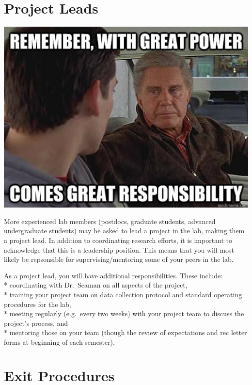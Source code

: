 \documentclass[
]{book}
\begin{document}
\hypertarget{project-leads}{%
\section{Project Leads}\label{project-leads}}

\includegraphics{images/power.jpg}

More experienced lab members (postdocs, graduate students, advanced undergraduate students) may be asked to lead a project in the lab, making them a project lead. In addition to coordinating research efforts, it is important to acknowledge that this is a leadership position. This means that you will most likely be repsonsible for supervising/mentoring some of your peers in the lab.

As a project lead, you will have additional responsibilities. These include:\\
* coordinating with Dr.~Seaman on all aspects of the project,\\
* training your project team on data collection protocol and standard operating procedures for the lab,\\
* meeting regularly (e.g.~every two weeks) with your project team to discuss the project's process, and\\
* mentoring those on your team (though the review of expectations and rec letter forms at beginning of each semester).

\hypertarget{exit-procedures}{%
\section{Exit Procedures}\label{exit-procedures}}
\end{document}
